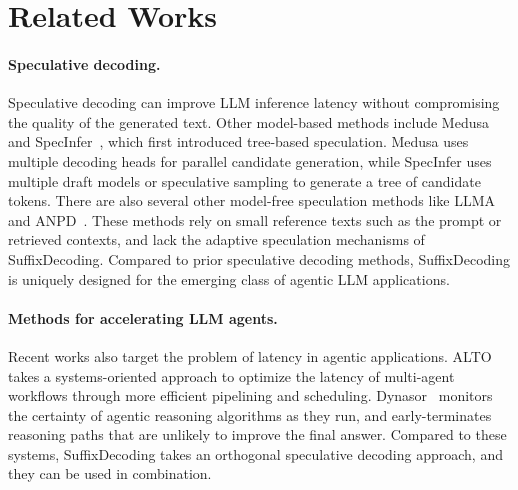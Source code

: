 \section{Related Works}

\paragraph{Speculative decoding.} Speculative decoding can improve LLM inference latency without compromising the quality of the generated text. Other model-based methods include Medusa~\citep{cai2024medusasimplellminference} and SpecInfer~\citep{specinfer}, which first introduced tree-based speculation. Medusa uses multiple decoding heads for parallel candidate generation, while SpecInfer uses multiple draft models or speculative sampling to generate a tree of candidate tokens.
There are also several other model-free speculation methods like
LLMA~\citep{yang2023inferencereferencelosslessacceleration} and ANPD~\citep{ou2024losslessaccelerationlargelanguage}. These methods rely on small reference texts such as the prompt or retrieved contexts, and lack the adaptive speculation mechanisms of SuffixDecoding. Compared to prior speculative decoding methods, SuffixDecoding is uniquely designed for the emerging class of agentic LLM applications.

\paragraph{Methods for accelerating LLM agents.} Recent works also target the problem of latency in agentic applications. ALTO~\citep{10.1145/3642970.3655844} takes a systems-oriented approach to optimize the latency of multi-agent workflows through more efficient pipelining and scheduling. Dynasor~\citep{fu2024efficientlyservingllmreasoning} monitors the certainty of agentic reasoning algorithms as they run, and early-terminates reasoning paths that are unlikely to improve the final answer. Compared to these systems, SuffixDecoding takes an orthogonal speculative decoding approach, and they can be used in combination.
